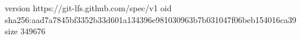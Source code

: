 version https://git-lfs.github.com/spec/v1
oid sha256:aad7a7845bf3352b33d601a134396e981030963b7b031047f06beb154016ca39
size 349676
